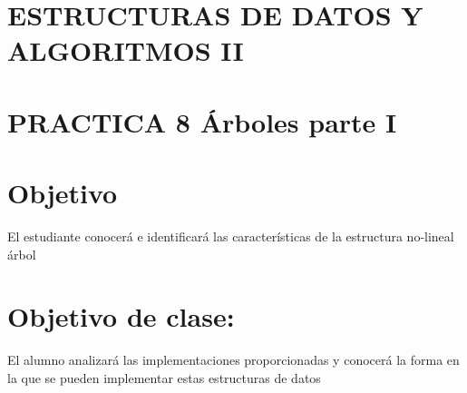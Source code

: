 



{\centering \section*{ESTRUCTURAS DE DATOS Y ALGORITMOS II}\par}
{\centering \section*{PRACTICA 8 Árboles parte I}\par}
\section*{Objetivo}
El estudiante conocerá e identificará las características de la estructura no-lineal árbol
\section*{Objetivo de clase:} El alumno analizará las implementaciones proporcionadas y conocerá la forma
en la que se pueden implementar estas estructuras de datos

